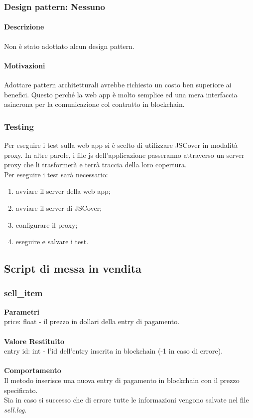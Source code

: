 \documentclass[a4paper, 12pt]{article}
\begin{document}
\subsubsection{Design pattern: Nessuno}
\paragraph{Descrizione}
Non è stato adottato alcun design pattern.
\paragraph{Motivazioni}
Adottare pattern architetturali avrebbe richiesto un costo ben superiore ai benefici. Questo perché la web app è molto semplice ed una mera interfaccia asincrona per la comunicazione col contratto in blockchain.
\subsubsection{Testing}
Per eseguire i test sulla web app si è scelto di utilizzare JSCover in modalità proxy.
In altre parole, i file js dell'applicazione passeranno attraverso un server proxy che li trasformerà e terrà traccia della loro copertura. \\
Per eseguire i test sarà necessario:
\begin{enumerate}
    \item avviare il server della web app;
    \item avviare il server di JSCover;
    \item configurare il proxy;
    \item eseguire e salvare i test.
\end{enumerate}

\subsection{Script di messa in vendita}
\subsubsection{sell\_item}
\textbf{Parametri}\\
price: float - il prezzo in dollari della entry di pagamento.\\\\
\textbf{Valore Restituito}\\
entry id: int - l'id dell'entry inserita in blockchain (-1 in caso di errore).\\\\
\textbf{Comportamento}\\
Il metodo inserisce una nuova entry di pagamento in blockchain con il prezzo specificato.\\
Sia in caso si successo che di errore tutte le informazioni vengono salvate nel file \textit{sell.log}.
\end{document}
